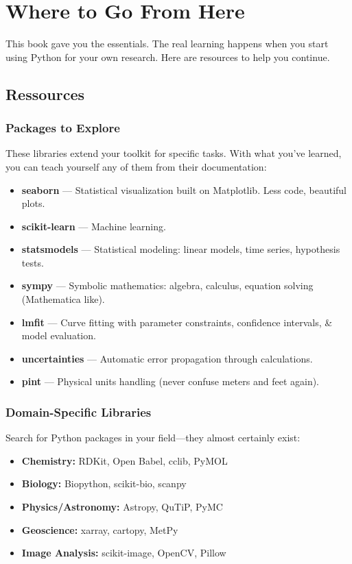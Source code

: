 
\chapter{Where to Go From Here}
\label{sec:next-steps}

This book gave you the essentials. The real learning happens when you start using Python for your own research. Here are resources to help you continue.

\section{Ressources}
\subsection{Packages to Explore}

These libraries extend your toolkit for specific tasks. With what you've learned, you can teach yourself any of them from their documentation:

\begin{itemize}
    \item \textbf{seaborn} --- Statistical visualization built on Matplotlib. Less code, beautiful plots.
    \item \textbf{scikit-learn} --- Machine learning.
    \item \textbf{statsmodels} --- Statistical modeling: linear models, time series, hypothesis tests.
    \item \textbf{sympy} --- Symbolic mathematics: algebra, calculus, equation solving (Mathematica like).
    \item \textbf{lmfit} --- Curve fitting with parameter constraints, confidence intervals, \& model evaluation.
    \item \textbf{uncertainties} --- Automatic error propagation through calculations.
    \item \textbf{pint} --- Physical units handling (never confuse meters and feet again).
\end{itemize}

\subsection{Domain-Specific Libraries}

Search for Python packages in your field---they almost certainly exist:
\begin{itemize}
    \item \textbf{Chemistry:} RDKit, Open Babel, cclib, PyMOL
    \item \textbf{Biology:} Biopython, scikit-bio, scanpy
    \item \textbf{Physics/Astronomy:} Astropy, QuTiP, PyMC
    \item \textbf{Geoscience:} xarray, cartopy, MetPy
    \item \textbf{Image Analysis:} scikit-image, OpenCV, Pillow
\end{itemize}

